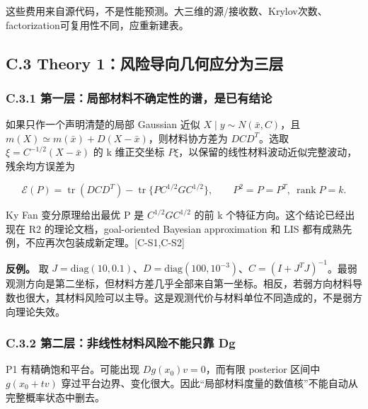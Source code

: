 \documentclass[
  11pt,
  a4paper,
]{article}
\begin{document}
这些费用来自源代码，不是性能预测。大三维的源/接收数、Krylov次数、factorization可复用性不同，应重新建表。

\hypertarget{c.3-theory-1ux98ceux9669ux5bfcux5411ux51e0ux4f55ux5e94ux5206ux4e3aux4e09ux5c42}{%
\subsection{C.3 Theory
1：风险导向几何应分为三层}\label{c.3-theory-1ux98ceux9669ux5bfcux5411ux51e0ux4f55ux5e94ux5206ux4e3aux4e09ux5c42}}

\hypertarget{c.3.1-ux7b2cux4e00ux5c42ux5c40ux90e8ux6750ux6599ux4e0dux786eux5b9aux6027ux7684ux8c31ux662fux5df2ux6709ux7ed3ux8bba}{%
\subsubsection{C.3.1
第一层：局部材料不确定性的谱，是已有结论}\label{c.3.1-ux7b2cux4e00ux5c42ux5c40ux90e8ux6750ux6599ux4e0dux786eux5b9aux6027ux7684ux8c31ux662fux5df2ux6709ux7ed3ux8bba}}

如果只作一个声明清楚的局部 Gaussian 近似 \(X\mid y\sim N(\bar x,C)\)，且
\(m(X)\simeq m(\bar x)+D(X-\bar x)\)，则材料协方差为 \(DCD^T\)。选取
\(\xi=C^{-1/2}(X-\bar x)\) 的 k 维正交坐标
\(P\xi\)，以保留的线性材料波动近似完整波动，残余均方误差为

\[
\mathcal{E}(P)=\operatorname{tr}(DCD^T)-\operatorname{tr}\{P C^{1/2}GC^{1/2}\},\qquad P^2=P=P^T,\ \operatorname{rank}P=k.
\]

Ky Fan 变分原理给出最优 P 是 \(C^{1/2}GC^{1/2}\) 的前 k
个特征方向。这个结论已经出现在 R2 的理论文档，goal-oriented Bayesian
approximation 和 LIS 都有成熟先例，不应再次包装成新定理。{[}C-S1,C-S2{]}

\textbf{反例。} 取
\(J=\mathrm{diag}(10,0.1)\)、\(D=\mathrm{diag}(100,10^{-3})\)、\(C=(I+J^TJ)^{-1}\)。最弱观测方向是第二坐标，但材料方差几乎全部来自第一坐标。相反，若弱方向材料导数也很大，其材料风险可以主导。这是观测代价与材料单位不同造成的，不是弱方向理论失效。

\hypertarget{c.3.2-ux7b2cux4e8cux5c42ux975eux7ebfux6027ux6750ux6599ux98ceux9669ux4e0dux80fdux53eaux9760-dg}{%
\subsubsection{C.3.2 第二层：非线性材料风险不能只靠
Dg}\label{c.3.2-ux7b2cux4e8cux5c42ux975eux7ebfux6027ux6750ux6599ux98ceux9669ux4e0dux80fdux53eaux9760-dg}}

P1 有精确饱和平台。可能出现 \(Dg(x_0)v=0\)，而有限 posterior 区间中
\(g(x_0+tv)\)
穿过平台边界、变化很大。因此``局部材料度量的数值核''不能自动从完整概率状态中删去。
\end{document}
